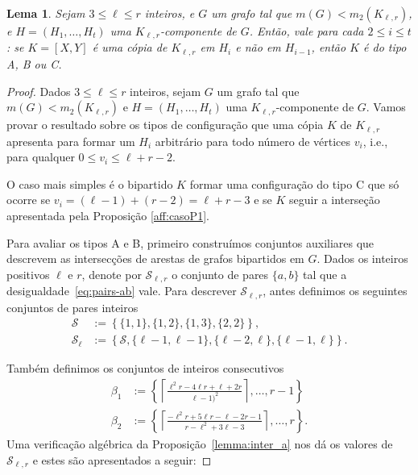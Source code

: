 \documentclass[12pt,a4paper]{book}
\newcommand{\K}{K_{\ell,r}} %
\newcommand{\Slr}{\mathcal{S}_{\ell,r}} %
\newtheorem{lema}      [teorema] {Lema}
\begin{document}
  
 \begin{lema}\label{lema:config}
        Sejam $3\leq \ell \leq r$ inteiros, e $G$ um grafo tal que $m(G) < m_2(\K)$, 
     e $H = (H_1, \ldots, H_t)$ uma $\K$-componente de $G$.  
    Então,  vale para cada $2\leq i \leq t$: 
    se $K = [X, Y]$ é uma cópia de $\K$ em
    $H_i$ e não em $H_{i-1}$, 
    então $K$ é do tipo A, B ou C.   
    \end{lema}
\begin{proof}
        Dados $3\leq \ell \leq r$ inteiros,
        sejam $G$ um grafo tal que $m(G) < m_2(\K)$ e
        $H = (H_1, \ldots, H_t)$ uma $\K$-componente de $G$.
        Vamos provar o resultado sobre os tipos de configuração que uma cópia $K$ de $\K$ apresenta para formar um $H_i$ arbitrário para todo número de vértices $v_i$, i.e., para qualquer $0\leq v_i \leq \ell+r-2$. %

     O caso mais simples é o bipartido $K$ formar uma configuração do tipo C que só ocorre se $v_i =(\ell-1)+(r-2) = \ell+r-3$ e se $K$ seguir a interseção apresentada pela Proposição \ref{aff:casoP1}.        
       
    Para avaliar os tipos A e B, primeiro construímos conjuntos auxiliares que descrevem as intersecções de arestas de grafos bipartidos em $G$.   
    Dados os inteiros positivos $\ell$ e $r$, denote por
    $\mathcal{S}_{\ell,r}$ o conjunto de pares $\{a,b\}$ tal que a desigualdade~\ref{eq:pairs-ab} vale.  
    Para descrever $\Slr$, antes definimos os seguintes conjuntos de pares inteiros
    \begin{align*} 
        \mathcal{S} &:= \left\{\{1,1\},\{1,2\},\{1,3\},\{2,2\}\right\},
    \\
    	\mathcal{S}_\ell &:=
    \left\{\mathcal{S},\{\ell-1,\ell-1\},\{\ell-2,\ell\},\{\ell-1,\ell\}\right\}.
    \end{align*} 
        
    Também definimos os conjuntos de inteiros consecutivos 
    \begin{align*}
        \beta_1 &:=
        \left\{\left\lceil \frac{\ell^2r - 4\ell r + \ell+2r}{\ell-1)^2}\right\rceil,\dots, r-1\right\}   
        \\
        \beta_2 &:=
        \left\{\left\lceil \frac{-\ell^2r +5\ell r - \ell-2r-1}{r-\ell^2+3\ell-3}\right\rceil,\ldots, r\right\}.
    \end{align*} 
    Uma verificação algébrica da Proposição~\ref{lemma:inter_a} nos dá os valores de $\mathcal{S}_{\ell,r}$ e estes são apresentados a seguir:
    

\end{proof}
\end{document}
